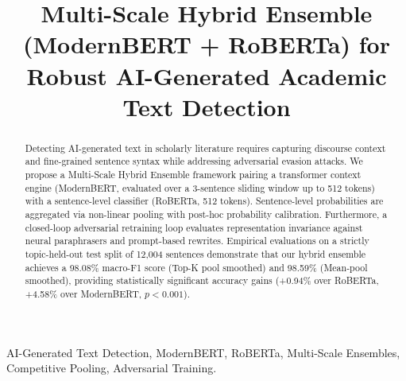 \documentclass[conference]{IEEEtran}
\begin{document}
\title{Multi-Scale Hybrid Ensemble (ModernBERT + RoBERTa) for Robust AI-Generated Academic Text Detection\\
}

\author{
\and
{}
}

\maketitle

\begin{abstract}
Detecting AI-generated text in scholarly literature requires capturing discourse context and fine-grained sentence syntax while addressing adversarial evasion attacks. We propose a Multi-Scale Hybrid Ensemble framework pairing a transformer context engine (ModernBERT, evaluated over a 3-sentence sliding window up to 512 tokens) with a sentence-level classifier (RoBERTa, 512 tokens). Sentence-level probabilities are aggregated via non-linear pooling with post-hoc probability calibration. Furthermore, a closed-loop adversarial retraining loop evaluates representation invariance against neural paraphrasers and prompt-based rewrites. Empirical evaluations on a strictly topic-held-out test split of 12,004 sentences demonstrate that our hybrid ensemble achieves a 98.08\% macro-F1 score (Top-K pool smoothed) and 98.59\% (Mean-pool smoothed), providing statistically significant accuracy gains (+0.94\% over RoBERTa, +4.58\% over ModernBERT, $p < 0.001$).
\end{abstract}

\begin{IEEEkeywords}
AI-Generated Text Detection, ModernBERT, RoBERTa, Multi-Scale Ensembles, Competitive Pooling, Adversarial Training.
\end{IEEEkeywords}
\end{document}
